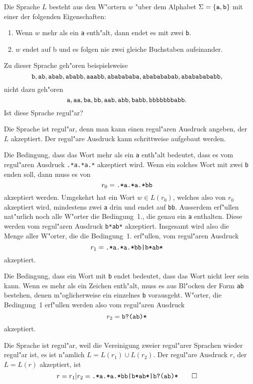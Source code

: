 Die Sprache $L$ besteht aus den W"ortern $w$ "uber dem Alphabet
$\Sigma=\{\text{\tt a},\text{\tt b}\}$ mit einer der folgenden Eigenschaften:
\begin{enumerate}
\item Wenn $w$ mehr als ein {\tt a} enth"alt, dann endet es mit zwei {\tt b}.
\item $w$ endet auf {\text b} und es folgen nie zwei gleiche
Buchstaben aufeinander.
\end{enumerate}
Zu dieser Sprache geh"oren beispielsweise
\[
\text{\tt b},
\text{\tt ab},
\text{\tt abab},
\text{\tt ababb},
\text{\tt aaabb},
\text{\tt ababababa},
\text{\tt ababababab},
\text{\tt abababababb},
\]
nicht dazu geh"oren
\[
\text{\tt a},
\text{\tt aa},
\text{\tt ba},
\text{\tt bb},
\text{\tt aab},
\text{\tt abb},
\text{\tt babb},
\text{\tt bbbbbbbabb}.
\]
Ist diese Sprache regul"ar?

\begin{loesung}
Die Sprache ist regul"ar, denn man kann einen regul"aren Ausdruck
angeben, der $L$ akzeptiert. Der regul"are Ausdruck kann schrittweise
aufgebaut werden.

Die Bedingung, dass das Wort mehr als ein {\tt a} enth"alt bedeutet,
dass es vom regul"aren Ausdruck {\tt .*a.*a.*} akzeptiert wird. Wenn
ein solches Wort mit zwei {\tt b} enden soll, dann muss es von
\[
r_0=\text{\tt .*a.*a.*bb}
\]
akzeptiert werden.
Umgekehrt hat ein Wort $w\in L(r_0)$, welches also von $r_0$ akzeptiert
wird, mindestens zwei {\tt a} drin und endet auf {\tt bb}.
Ausserdem erf"ullen nat"urlich noch alle W"orter
die Bedingung~1., die genau ein {\tt a} enthalten. Diese werden
vom regul"aren Ausdruck {\tt b*ab*} akzeptiert. Insgesamt wird also die
Menge aller W"orter, die die Bedingung~1. erf"ullen, vom regul"aren
Ausdruck
\[
r_1=\text{\tt .*a.*a.*bb|b*ab*}
\]
akzeptiert.

Die Bedingung, dass ein Wort mit {\tt b} endet bedeutet, dass das Wort
nicht leer sein kann. Wenn es mehr als ein Zeichen enth"alt, muss es
aus Bl"ocken der Form {\tt ab} bestehen, denen m"oglicherweise ein
einzelnes {\tt b} vorausgeht. W"orter, die Bedingung~1 erf"ullen werden
also vom regul"aren Ausdruck
\[
r_2=\text{\tt b?(ab)*}
\]
akzeptiert.

Die Sprache ist regul"ar, weil die Vereinigung zweier regul"arer Sprachen
wieder regul"ar ist, es ist n"amlich $L=L(r_1)\cup L(r_2)$. Der regul"are
Ausdruck $r$, der $L=L(r)$ akzeptiert, ist
\[
r=r_1|r_2 =
\text{\tt .*a.*a.*bb|b*ab*|b?(ab)*}
\qedhere
\]
\end{loesung}
